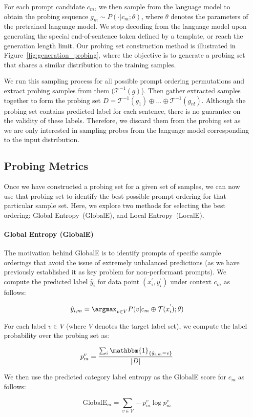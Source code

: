 For each prompt candidate $c_m$, we then sample from the language model to obtain the probing sequence $g_m \sim P(\cdot| c_m; \theta) $, where $\theta$ denotes the parameters of the pretrained language model. We stop decoding from the language model upon generating the special end-of-sentence token defined by a template, or reach the generation length limit. Our probing set construction method is illustrated in  Figure~\ref{fig:generation_probing}, where the objective is to generate a probing set that shares a similar distribution to the training samples.  

We run this sampling process for all possible prompt ordering permutations and extract probing samples from them ($\mathcal{T}^{-1}(g)$).
Then gather extracted samples together to form the probing set $D = \mathcal{T}^{-1}(g_1) \oplus ... \oplus \mathcal{T}^{-1}(g_{n!})$.
Although the probing set contains predicted label for each sentence, there is no guarantee on the validity of these labels. Therefore, we discard them from the probing set as we are only interested in sampling probes from the language model corresponding to the input distribution.

\subsection{Probing Metrics}

Once we have constructed a probing set for a given set of samples, we can now use that probing set to identify the best possible prompt ordering for that particular sample set. Here, we explore two methods for selecting the best ordering: Global Entropy~(GlobalE), and Local Entropy~(LocalE).

\paragraph{Global Entropy (GlobalE)}{ The motivation behind GlobalE is to identify prompts of specific sample orderings that avoid the issue of extremely unbalanced predictions (as we have previously established it as key problem for non-performant prompts). We compute the predicted label $\hat{y}_i$ for data point $(x^{'}_i, y^{'}_i)$ under context $c_m$ as follows:

\begin{equation}
    \hat{y}_{i,m} = \argmax_{v \in V} P(v|c_m\oplus \mathcal{T}(x^{'}_i);\theta )
\end{equation}

For each label $v \in V$ (where $V$ denotes the target label set), we compute the label probability over the probing set as:

\begin{equation}
p^{v}_{m} = \frac{\sum_{i} \mathbbm{1}_{\{\hat{y}_{i,m} = v\}}}{|D|}
\end{equation}

We then use the predicted category label entropy as the GlobalE score for $c_m$ as follows:

\begin{equation}
    \text{GlobalE}_{m} = \sum_{v \in V} -p^{v}_{m} \log{p^{v}_{m}}
\end{equation}

}

